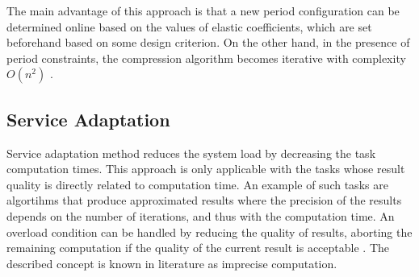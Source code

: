 The main advantage of this approach is that a new period configuration can be determined online based on the values of elastic coefficients, which are set beforehand based on some design criterion.
On the other hand, in the presence of period constraints, the compression algorithm becomes iterative with complexity \( O(n^2) \) \cite{lee2007handbook}.

\subsection{Service Adaptation}
Service adaptation method reduces the system load by decreasing the task computation times. 
This approach is only applicable with the tasks whose result quality is directly related to computation time.
An example of such tasks are algortihms that produce approximated results where the precision of the results depends on the number of iterations, and thus with the computation time. 
An overload condition can be handled by reducing the quality of results, aborting the remaining computation if the quality of the current result is acceptable \cite{buttazzo2011hard}. 
The described concept is known in literature as imprecise computation. 


